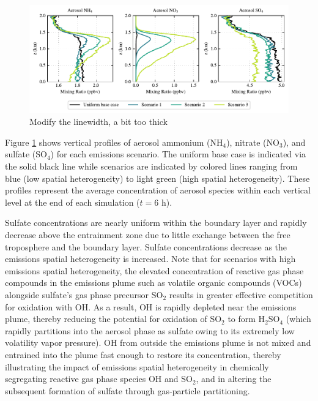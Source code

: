 \documentclass[journal abbreviation, manuscript]{copernicus}
\begin{document}
\begin{figure}[!h]
	\centering
	\includegraphics[]{figures/aerosol-SNA-vertical-profiles-time36.pdf}
	\caption{Modify the linewidth, a bit too thick}
	\label{fig:vertical-profile-SNA}
\end{figure} 

Figure \ref{fig:vertical-profile-SNA} shows vertical profiles of aerosol ammonium (NH$_4$), nitrate (NO$_3$), and sulfate (SO$_4$) for each emissions scenario. The uniform base case is indicated via the solid black line while scenarios are indicated by colored lines ranging from blue (low spatial heterogeneity) to light green (high spatial heterogeneity). These profiles represent the average concentration of aerosol species within each vertical level at the end of each simulation ($t=6$ h). 

Sulfate concentrations are nearly uniform within the boundary layer and rapidly decrease above the entrainment zone due to little exchange between the free troposphere and the boundary layer. Sulfate concentrations decrease as the emissions spatial heterogeneity is increased. Note that for scenarios with high emissions spatial heterogeneity, the elevated concentration of reactive gas phase compounds in the emissions plume such as volatile organic compounds (VOCs) alongside sulfate's gas phase precursor SO$_2$ results in greater effective competition for oxidation with OH. As a result, OH is rapidly depleted near the emissions plume, thereby reducing the potential for oxidation of SO$_2$ to form H$_2$SO$_4$ (which rapidly partitions into the aerosol phase as sulfate owing to its extremely low volatility vapor pressure). OH from outside the emissions plume is not mixed and entrained into the plume fast enough to restore its concentration, thereby illustrating the impact of emissions spatial heterogeneity in chemically segregating reactive gas phase species OH and SO$_2$, and in altering the subsequent formation of sulfate through gas-particle partitioning.
\end{document}
